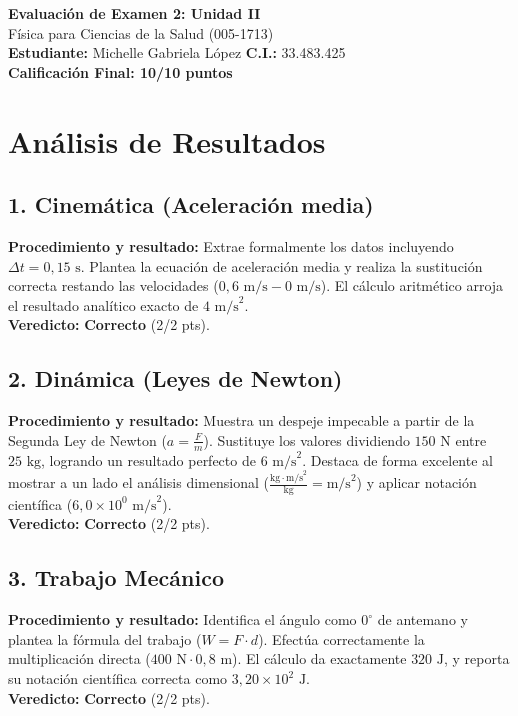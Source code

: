 \documentclass[12pt,letterpaper]{article}
\begin{document}
\begin{center}
    \Large \textbf{Evaluación de Examen 2: Unidad II} \\
    \large Física para Ciencias de la Salud (005-1713) \\
    \vspace{0.5cm}
    \textbf{Estudiante:} Michelle Gabriela López \quad \textbf{C.I.:} 33.483.425
    \vspace{0.3cm} \\
    \large \textbf{Calificación Final: 10/10 puntos}
\end{center}

\vspace{0.5cm}

\section*{Análisis de Resultados}

\subsection*{1. Cinemática (Aceleración media)}
\textbf{Procedimiento y resultado:} Extrae formalmente los datos incluyendo $\Delta t = 0,15 \text{ s}$. Plantea la ecuación de aceleración media y realiza la sustitución correcta restando las velocidades ($0,6 \text{ m/s} - 0 \text{ m/s}$). El cálculo aritmético arroja el resultado analítico exacto de $4 \text{ m/s}^2$. \\
\textbf{Veredicto:} \textbf{Correcto} (2/2 pts).

\subsection*{2. Dinámica (Leyes de Newton)}
\textbf{Procedimiento y resultado:} Muestra un despeje impecable a partir de la Segunda Ley de Newton ($a = \frac{F}{m}$). Sustituye los valores dividiendo $150 \text{ N}$ entre $25 \text{ kg}$, logrando un resultado perfecto de $6 \text{ m/s}^2$. Destaca de forma excelente al mostrar a un lado el análisis dimensional ($\frac{\text{kg} \cdot \text{m/s}^2}{\text{kg}} = \text{m/s}^2$) y aplicar notación científica ($6,0 \times 10^0 \text{ m/s}^2$). \\
\textbf{Veredicto:} \textbf{Correcto} (2/2 pts).

\subsection*{3. Trabajo Mecánico}
\textbf{Procedimiento y resultado:} Identifica el ángulo como $0^\circ$ de antemano y plantea la fórmula del trabajo ($W = F \cdot d$). Efectúa correctamente la multiplicación directa ($400 \text{ N} \cdot 0,8 \text{ m}$). El cálculo da exactamente $320 \text{ J}$, y reporta su notación científica correcta como $3,20 \times 10^2 \text{ J}$. \\
\textbf{Veredicto:} \textbf{Correcto} (2/2 pts).
\end{document}
